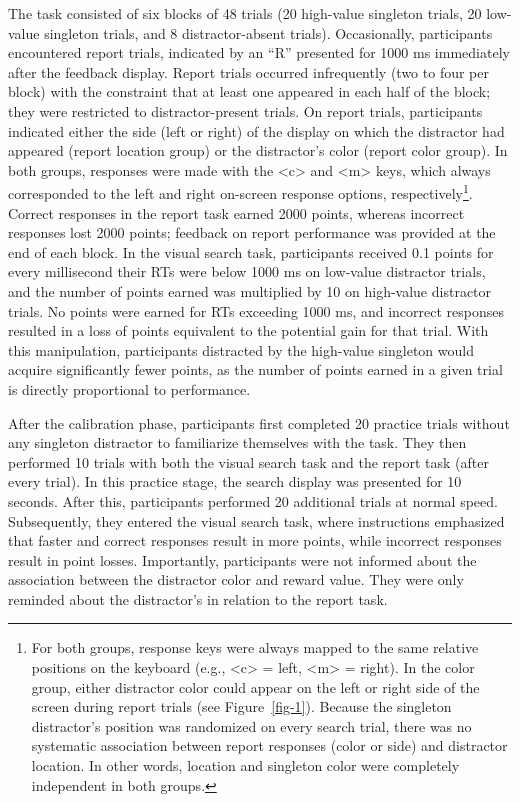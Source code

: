 \documentclass[
  man,
  floatsintext,
  longtable,
  nolmodern,
  notxfonts,
  notimes,
  mask,
  colorlinks=true,linkcolor=blue,citecolor=blue,urlcolor=blue]{apa7}
\begin{document}
The task consisted of six blocks of 48 trials (20 high-value singleton
trials, 20 low-value singleton trials, and 8 distractor-absent trials).
Occasionally, participants encountered report trials, indicated by an
``R'' presented for 1000 ms immediately after the feedback display.
Report trials occurred infrequently (two to four per block) with the
constraint that at least one appeared in each half of the block; they
were restricted to distractor-present trials. On report trials,
participants indicated either the side (left or right) of the display on
which the distractor had appeared (report location group) or the
distractor's color (report color group). In both groups, responses were
made with the \textless c\textgreater{} and \textless m\textgreater{}
keys, which always corresponded to the left and right on-screen response
options, respectively\footnote{For both groups, response keys were
  always mapped to the same relative positions on the keyboard (e.g.,
  \textless c\textgreater{} = left, \textless m\textgreater{} = right).
  In the color group, either distractor color could appear on the left
  or right side of the screen during report trials (see
  Figure~\ref{fig-1}). Because the singleton distractor's position was
  randomized on every search trial, there was no systematic association
  between report responses (color or side) and distractor location. In
  other words, location and singleton color were completely independent
  in both groups.}. Correct responses in the report task earned 2000
points, whereas incorrect responses lost 2000 points; feedback on report
performance was provided at the end of each block. In the visual search
task, participants received 0.1 points for every millisecond their RTs
were below 1000 ms on low-value distractor trials, and the number of
points earned was multiplied by 10 on high-value distractor trials. No
points were earned for RTs exceeding 1000 ms, and incorrect responses
resulted in a loss of points equivalent to the potential gain for that
trial. With this manipulation, participants distracted by the high-value
singleton would acquire significantly fewer points, as the number of
points earned in a given trial is directly proportional to performance.

After the calibration phase, participants first completed 20 practice
trials without any singleton distractor to familiarize themselves with
the task. They then performed 10 trials with both the visual search task
and the report task (after every trial). In this practice stage, the
search display was presented for 10 seconds. After this, participants
performed 20 additional trials at normal speed. Subsequently, they
entered the visual search task, where instructions emphasized that
faster and correct responses result in more points, while incorrect
responses result in point losses. Importantly, participants were not
informed about the association between the distractor color and reward
value. They were only reminded about the distractor's in relation to the
report task.
\end{document}
